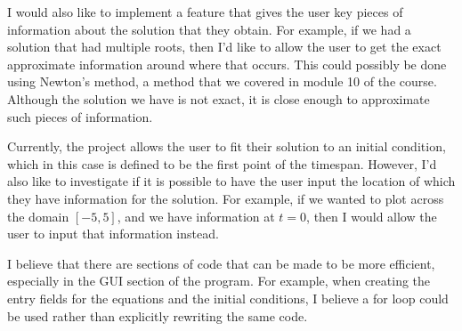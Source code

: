 \documentclass[12pt]{report}
\begin{document}
I would also like to implement a feature that gives the user key pieces of information about the solution that they obtain. For example, if we had a solution that had multiple roots, then I'd like to allow the user to get the exact approximate information around where that occurs. This could possibly be done using Newton's method, a method that we covered in module 10 of the course. Although the solution we have is not exact, it is close enough to approximate such pieces of information.
\smallskip

Currently, the project allows the user to fit their solution to an initial condition, which in this case is defined to be the first point of the timespan. However, I'd also like to investigate if it is possible to have the user input the location of which they have information for the solution. For example, if we wanted to plot across the domain $[-5,5]$, and we have information at $t = 0$, then I would allow the user to input that information instead.
\smallskip

I believe that there are sections of code that can be made to be more efficient, especially in the GUI section of the program. For example, when creating the entry fields for the equations and the initial conditions, I believe a for loop could be used rather than explicitly rewriting the same code. 
\end{document}
